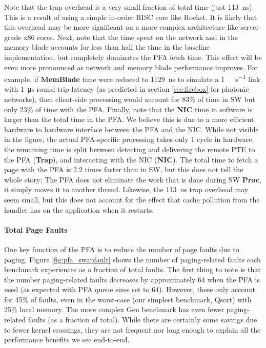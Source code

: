   Note that the trap overhead is a very small fraction of total time (just
  \SI{113}{\nano\second}). This is a result of using a simple in-order RISC
  core like Rocket. It is likely that this overhead may be more significant on
  a more complex architecture like server-grade x86 cores. Next, note that the
  time spent on the network and in the memory blade accounts for less than half
  the time in the baseline implementation, but completely dominates the PFA
  fetch time. This effect will be even more pronounced as network and memory
  blade performance improves. For example, if \textbf{MemBlade} time were
  reduced to \SI{1129}{\nano\second} to simulate a \SI{1}{\tera\bit\per\second}
  link with \SI{1}{\micro\second} round-trip latency (as predicted in section
  \ref{sec:firebox} for photonic networks), then client-side processing would
  account for 83\% of time in SW but only 23\% of time with the PFA. Finally,
  note that the \textbf{NIC} time in software is larger than the total time in
  the PFA. We believe this is due to a more efficient hardware to hardware
  interface between the PFA and the NIC. While not visible in the figure, the
  actual PFA-specific processing takes only 1 cycle in hardware, the remaining
  time is split between detecting and delivering the remote PTE to the PFA
  (\textbf{Trap}), and interacting with the NIC (\textbf{NIC}). The total time
  to fetch a page with the PFA is 2.2 times faster than in SW, but this does
  not tell the whole story; The PFA does not eliminate the work that is done
  during SW \textbf{Proc}, it simply moves it to another thread. Likewise, the
  \SI{113}{\nano\second} trap overhead may seem small, but this does not
  account for the effect that cache pollution from the handler has on the
  application when it restarts.

  \paragraph{Total Page Faults}
  One key function of the PFA is to reduce the number of page faults due
  to paging. Figure \ref{fig:pfa_swapfault} shows the number of paging-related
  faults each benchmark experiences as a fraction of total faults. The first
  thing to note is that the number paging-related faults decreases by
  approximately 64 when the PFA is used (as expected with PFA queue sizes set
  to 64). However, these only account for
  45\% of faults, even in the worst-case (our simplest benchmark, Qsort) with
  25\% local memory. The more complex Gen benchmark has even fewer
  paging-related faults (as a fraction of total). While there are certainly
  some savings due to fewer kernel crossings, they are not frequent nor long enough to
  explain all the performance benefits we see end-to-end.
 
